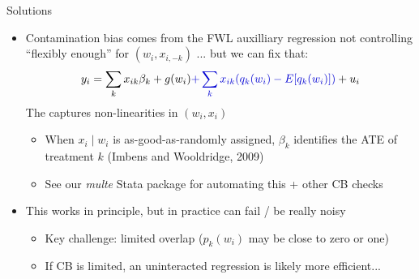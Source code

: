 \documentclass[11pt,english]{beamer}
\begin{document}
\begin{frame}{Solutions}
\vspace{0.2cm}
\begin{itemize}
\item Contamination bias comes from the FWL auxilliary regression not controlling ``flexibly enough'' for $(w_i,x_{i,-k})$ ... but we can fix that:
\begin{align*}
y_i=\sum_k x_{ik}\beta_k +g(w_i) {\color{blue}{+\sum_k x_{ik}(q_k(w_i)-E[q_k(w_i)])}}+u_i
\end{align*}
The {\color{blue}{blue term}} captures non-linearities in $(w_i,x_{i})$ \smallskip\pause{}
\begin{itemize}
\item When $x_i\mid w_i$ is as-good-as-randomly assigned, $\beta_k$ identifies the ATE of treatment $k$ (Imbens and Wooldridge, 2009)\smallskip
\item See our \emph{multe} Stata package for automating this + other CB checks
\end{itemize}\bigskip\pause{}

\item This works in principle, but in practice can fail / be really noisy \smallskip
\begin{itemize}
\item Key challenge: limited overlap ($p_k(w_i)$ may be close to zero or one)\smallskip
\item If CB is limited, an uninteracted regression is likely more efficient...
\end{itemize}
\end{itemize}
\end{frame}
\end{document}
